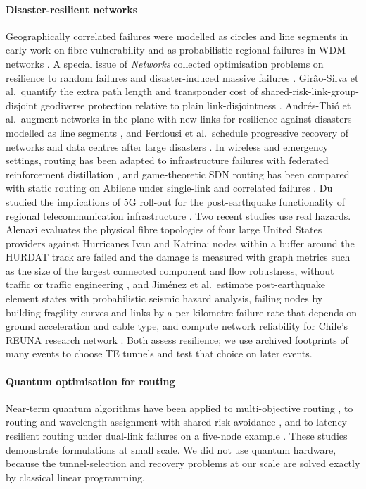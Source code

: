 \documentclass[preprint,12pt]{elsarticle}
\begin{document}
\paragraph{Disaster-resilient networks}
Geographically correlated failures were modelled as circles and line segments in early work on fibre vulnerability \cite{neumayer10,neumayer11} and as probabilistic regional failures in WDM networks \cite{agarwal13}. A special issue of \emph{Networks} collected optimisation problems on resilience to random failures and disaster-induced massive failures \cite{rak20}. Girão-Silva et al.\ quantify the extra path length and transponder cost of shared-risk-link-group-disjoint geodiverse protection relative to plain link-disjointness \cite{giraosilva20}. Andrés-Thió et al.\ augment networks in the plane with new links for resilience against disasters modelled as line segments \cite{andresthio22}, and Ferdousi et al.\ schedule progressive recovery of networks and data centres after large disasters \cite{ferdousi20}. In wireless and emergency settings, routing has been adapted to infrastructure failures with federated reinforcement distillation \cite{fedrdr24}, and game-theoretic SDN routing has been compared with static routing on Abilene under single-link and correlated failures \cite{sreeveda26}. Du studied the implications of 5G roll-out for the post-earthquake functionality of regional telecommunication infrastructure \cite{du24}. Two recent studies use real hazards. Alenazi evaluates the physical fibre topologies of four large United States providers against Hurricanes Ivan and Katrina: nodes within a buffer around the HURDAT track are failed and the damage is measured with graph metrics such as the size of the largest connected component and flow robustness, without traffic or traffic engineering \cite{alenazi23}, and Jiménez et al.\ estimate post-earthquake element states with probabilistic seismic hazard analysis, failing nodes by building fragility curves and links by a per-kilometre failure rate that depends on ground acceleration and cable type, and compute network reliability for Chile's REUNA research network \cite{jimenez23}. Both assess resilience; we use archived footprints of many events to choose TE tunnels and test that choice on later events.

\paragraph{Quantum optimisation for routing}
Near-term quantum algorithms have been applied to multi-objective routing \cite{chiew24,bouchmal25}, to routing and wavelength assignment with shared-risk avoidance \cite{davies25}, and to latency-resilient routing under dual-link failures on a five-node example \cite{harb26}. These studies demonstrate formulations at small scale. We did not use quantum hardware, because the tunnel-selection and recovery problems at our scale are solved exactly by classical linear programming.
\end{document}
